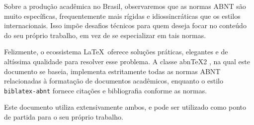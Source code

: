Sobre a produção acadêmica no Brasil, observaremos que as normas ABNT são muito específicas, frequentemente mais rígidas e idiossincráticas que os estilos internacionais. Isso impõe desafios técnicos para quem deseja focar no conteúdo do seu próprio trabalho, em vez de se especializar em tais normas.

Felizmente, o ecossistema \LaTeX\ oferece soluções práticas, elegantes e de altíssima qualidade para resolver esse problema. A classe abn\TeX2 \cite{abntex2classe}, na qual este documento se baseia, implementa estritamente todas as normas ABNT relacionadas à formatação de documentos acadêmicos, enquanto o estilo \verb|biblatex-abnt| \cite{biblatex-abnt} fornece citações e bibliografia conforme as normas.

Este documento utiliza extensivamente ambos, e pode ser utilizado como ponto de partida para o seu próprio trabalho.

